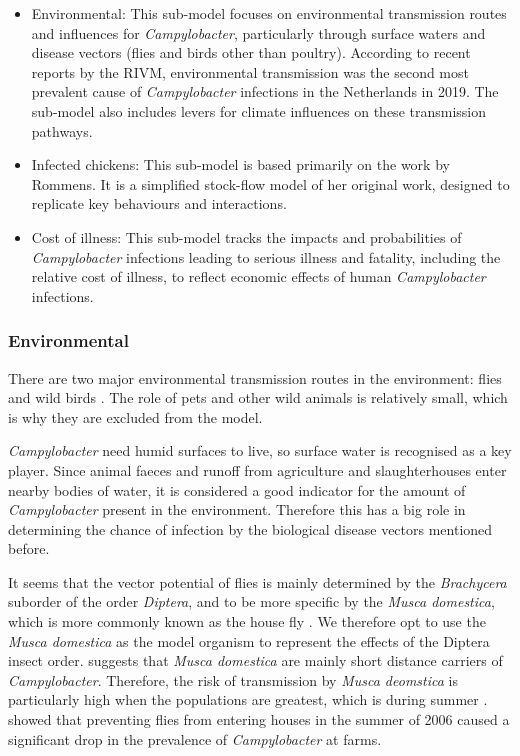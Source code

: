 \begin{itemize}
    \item Environmental: This sub-model focuses on environmental transmission routes and influences for \textit{Campylobacter}, particularly through surface waters and disease vectors (flies and birds other than poultry). According to recent reports by the RIVM, environmental transmission was the second most prevalent cause of \textit{Campylobacter} infections in the Netherlands in 2019. The sub-model also includes levers for climate influences on these transmission pathways.
    \item Infected chickens: This sub-model is based primarily on the work by Rommens. It is a simplified stock-flow model of her original work, designed to replicate key behaviours and interactions.
    \item Cost of illness: This sub-model tracks the impacts and probabilities of \textit{Campylobacter} infections leading to serious illness and fatality, including the relative cost of illness, to reflect economic effects of human \textit{Campylobacter} infections.

\end{itemize}

\subsubsection*{Environmental}
There are two major environmental transmission routes in the environment: flies and wild birds \parencite{mughini-gras_quantifying_2016}. The role of pets and other wild animals is relatively small, which is why they are excluded from the model.

\textit{Campylobacter} need humid surfaces to live, so surface water is recognised as a key player. Since animal faeces and runoff from agriculture and slaughterhouses enter nearby bodies of water, it is considered a good indicator for the amount of \textit{Campylobacter} present in the environment. Therefore this has a big role in determining the chance of infection by the biological disease vectors mentioned before.

It seems that the vector potential of flies is mainly determined by the \textit{Brachycera} suborder of the order \textit{Diptera}, and to be more specific by the \textit{Musca domestica}, which is more commonly known as the house fly \parencite{hald_influxed_2008}. We therefore opt to use the \textit{Musca domestica} as the model organism to represent the effects of the Diptera insect order. \cite{skovgard_retention_2011} suggests that \textit{Musca domestica} are mainly short distance carriers of \textit{Campylobacter}. Therefore, the risk of transmission by \textit{Musca deomstica} is particularly high when the populations are greatest, which is during summer \parencite{royden_role_2016}. \cite{hald_use_2007} showed that preventing flies from entering houses in the summer of 2006 caused a significant drop in the prevalence of \textit{Campylobacter} at farms.

